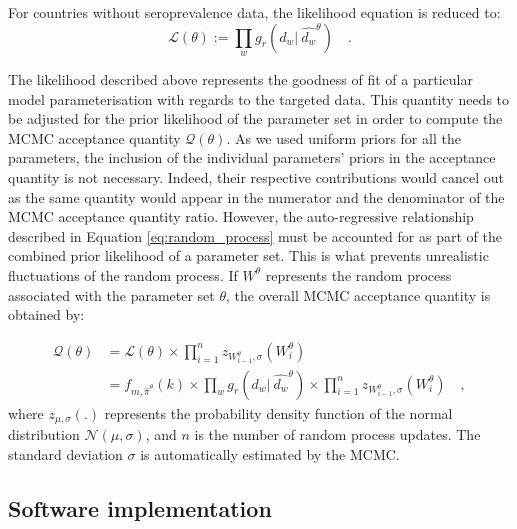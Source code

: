 For countries without seroprevalence data, the likelihood equation is reduced to:
\begin{equation}
    \label{eq:likelihood_nosero}
    \mathcal{L}(\theta) := \prod_w g_r(d_w | \:\hat{d_w}^\theta) \quad.
\end{equation}

The likelihood described above represents the goodness of fit of a particular model parameterisation with regards to the targeted data. 
This quantity needs to be adjusted for the prior likelihood of the parameter set in order to compute the MCMC acceptance quantity $\mathcal{Q}(\theta)$.
As we used uniform priors for all the parameters, the inclusion of the individual parameters' priors in the acceptance quantity is not necessary. 
Indeed, their respective contributions would cancel out as the same quantity would appear in the numerator and the denominator of the 
MCMC acceptance quantity ratio. However, the auto-regressive relationship described in Equation \ref{eq:random_process}
must be accounted for as part of the combined prior likelihood of a parameter set. This is what prevents unrealistic fluctuations of the random process.
If $W^\theta$ represents the random process associated with the parameter set $\theta$, the overall MCMC acceptance quantity is obtained by:

\begin{equation}
    \label{eq:acc_qtt}
    \begin{split}
    \mathcal{Q}(\theta) & = \mathcal{L}(\theta) \times \prod_{i=1}^{n} z_{W^\theta_{i-1},\sigma}(W^\theta_i) \\
                        & = f_{m,\hat{\pi}^\theta}(k) \times \prod_w g_r(d_w | \:\hat{d_w}^\theta) \times \prod_{i=1}^{n} z_{W^\theta_{i-1},\sigma}(W^\theta_i) \quad ,
    \end{split}
\end{equation}
where $z_{\mu,\sigma}(.)$ represents the probability density function of the normal distribution $\mathcal{N}(\mu, \sigma)$, and $n$ is the number 
of random process updates. The standard deviation $\sigma$ is automatically estimated by the MCMC.

\subsection{Software implementation}

